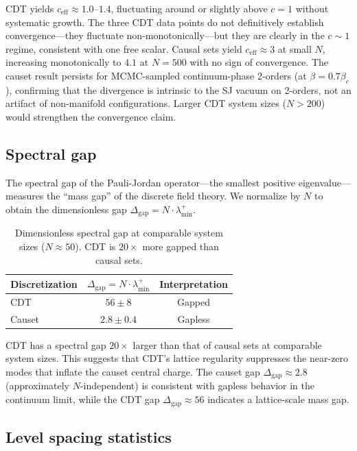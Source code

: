 \documentclass[aps,prd,twocolumn,superscriptaddress,nofootinbib]{revtex4-2}
\begin{document}
CDT yields $c_{\mathrm{eff}} \approx 1.0$--$1.4$, fluctuating around or slightly above $c = 1$ without systematic growth. The three CDT data points do not definitively establish convergence---they fluctuate non-monotonically---but they are clearly in the $c \sim 1$ regime, consistent with one free scalar. Causal sets yield $c_{\mathrm{eff}} \approx 3$ at small $N$, increasing monotonically to $4.1$ at $N = 500$ with no sign of convergence. The causet result persists for MCMC-sampled continuum-phase 2-orders (at $\beta = 0.7\beta_c$), confirming that the divergence is intrinsic to the SJ vacuum on 2-orders, not an artifact of non-manifold configurations. Larger CDT system sizes ($N > 200$) would strengthen the convergence claim.

\subsection{Spectral gap}

The spectral gap of the Pauli-Jordan operator---the smallest positive eigenvalue---measures the ``mass gap'' of the discrete field theory. We normalize by $N$ to obtain the dimensionless gap $\Delta_{\mathrm{gap}} = N \cdot \lambda_{\min}^+$.

\begin{table}[h]
\centering
\begin{tabular}{lcc}
\toprule
Discretization & $\Delta_{\mathrm{gap}} = N \cdot \lambda_{\min}^+$ & Interpretation \\
\midrule
CDT & $56 \pm 8$ & Gapped \\
Causet & $2.8 \pm 0.4$ & Gapless \\
\bottomrule
\end{tabular}
\caption{Dimensionless spectral gap at comparable system sizes ($N \approx 50$). CDT is $20\times$ more gapped than causal sets.}
\label{tab:gap}
\end{table}

CDT has a spectral gap $20\times$ larger than that of causal sets at comparable system sizes. This suggests that CDT's lattice regularity suppresses the near-zero modes that inflate the causet central charge. The causet gap $\Delta_{\mathrm{gap}} \approx 2.8$ (approximately $N$-independent) is consistent with gapless behavior in the continuum limit, while the CDT gap $\Delta_{\mathrm{gap}} \approx 56$ indicates a lattice-scale mass gap.

\subsection{Level spacing statistics}
\end{document}
